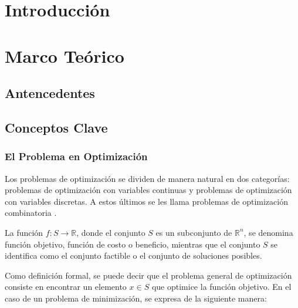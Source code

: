 \documentclass[12pt,titlepage,twoside,openright]{book}
\makeatletter
\def\cleardoublepage{\clearpage\if@twoside \ifodd\c@page\else
\hbox{}
\thispagestyle{empty}
\newpage
\if@twocolumn\hbox{}\newpage\fi\fi\fi}
\makeatother
\begin{document}
\tableofcontents
\cleardoublepage
\listoffigures
\cleardoublepage
\listoftables
\cleardoublepage
\listofmyequations
\cleardoublepage


\mainmatter
\pagestyle{fancy}
\fancyhf{}
\fancyhead[RO,LE]{\bfseries \thepage}
\fancyhead[LO]{\nouppercase{\rightmark}}
\fancyhead[RE]{\nouppercase{\leftmark}}
\fancyfoot{}

\setlength{\parindent}{0pt}
\setlength{\parskip}{1.5ex}

\newcommand{\tab}{\hspace*{1cm}}

\chapter{Introducción}
\label{cap:introduccion}

\chapter{Marco Teórico}
\label{cap:marco-teorico}
\section{Antencedentes}
\section{Conceptos Clave}
\subsection{El Problema en Optimización}

Los problemas de optimización se dividen de manera natural en dos categorías: problemas de optimización con variables continuas y problemas de optimización con variables discretas. A estos últimos se les llama problemas de optimización combinatoria \citep{cobos2010}.

La función \(f : S \to \mathbb{R}\), donde el conjunto \(S\) es un subconjunto de \(\mathbb{R}^n\), se denomina función objetivo, función de costo o beneficio, mientras que el conjunto \(S\) se identifica como el conjunto factible o el conjunto de soluciones posibles.

Como definición formal, se puede decir que el problema general de optimización consiste en encontrar un elemento \(x \in S\) que optimice la función objetivo. En el caso de un problema de minimización, se expresa de la siguiente manera:
\end{document}

